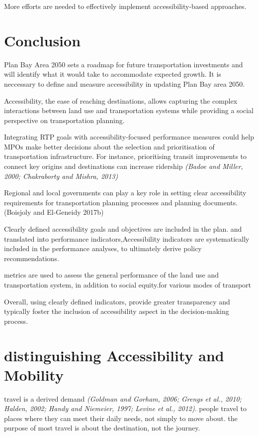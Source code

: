 \documentclass[12pt,]{article}
\begin{document}
More efforts are needed to effectively implement accessibility-based
approaches.

\hypertarget{conclusion}{%
\section{Conclusion}\label{conclusion}}

Plan Bay Area 2050 sets a roadmap for future transportation investments
and will identify what it would take to accommodate expected growth. It
is neccessary to define and measure accessibility in updating Plan Bay
area 2050.

Accessibility, the ease of reaching destinations, allows capturing the
complex interactions between land use and transportation systems while
providing a social perspective on transportation planning.

Integrating RTP goals with accessibility-focused performance measures
could help MPOs make better decisions about the selection and
prioritisation of transportation infrastructure. For instance,
prioritising transit improvements to connect key origins and
destinations can increase ridership \emph{(Badoe and Miller, 2000;
Chakraborty and Mishra, 2013)}

Regional and local governments can play a key role in setting clear
accessibility requirements for transportation planning processes and
planning documents. (Boisjoly and El-Geneidy 2017b)

Clearly defined accessibility goals and objectives are included in the
plan. and translated into performance indicators,Accessibility
indicators are systematically included in the performance analyses, to
ultimately derive policy recommendations.

metrics are used to assess the general performance of the land use and
transportation system, in addition to social equity.for various modes of
transport

Overall, using clearly defined indicators, provide greater transparency
and typically foster the inclusion of accessibility aspect in the
decision-making process.

\hypertarget{distinguishing-accessibility-and-mobility}{%
\section{distinguishing Accessibility and
Mobility}\label{distinguishing-accessibility-and-mobility}}

travel is a derived demand \emph{(Goldman and Gorham, 2006; Grengs et
al., 2010; Halden, 2002; Handy and Niemeier, 1997; Levine et al.,
2012)}. people travel to places where they can meet their daily needs,
not simply to move about. the purpose of most travel is about the
destination, not the journey.
\end{document}
